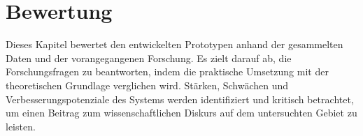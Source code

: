 \chapter{Bewertung}
\label{chp:assessment}

Dieses Kapitel bewertet den entwickelten Prototypen anhand der gesammelten Daten und der vorangegangenen Forschung. Es zielt darauf ab, die Forschungsfragen zu beantworten, indem die praktische Umsetzung mit der theoretischen Grundlage verglichen wird. Stärken, Schwächen und Verbesserungspotenziale des Systems werden identifiziert und kritisch betrachtet, um einen Beitrag zum wissenschaftlichen Diskurs auf dem untersuchten Gebiet zu leisten.


